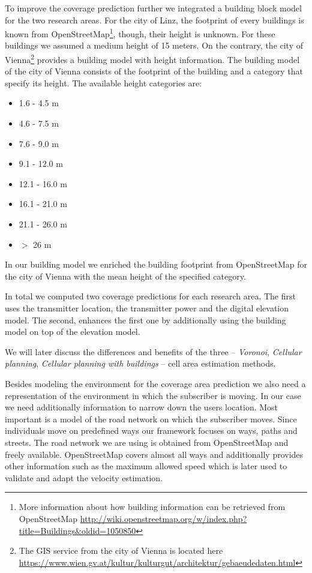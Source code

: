 \documentclass[twocolumn]{bmcart}%
\begin{document}
To improve the coverage prediction further we integrated a building block model for the two research areas. For the city of Linz, the footprint of every buildings is known from OpenStreetMap\footnote{More information about how building information can be retrieved from OpenStreetMap \url{http://wiki.openstreetmap.org/w/index.php?title=Buildings&oldid=1050850}}, though, their height is unknown. For these buildings we assumed a medium height of 15 meters. On the contrary, the city of Vienna\footnote{The GIS service from the city of Vienna is located here \url{https://www.wien.gv.at/kultur/kulturgut/architektur/gebaeudedaten.html}} provides a building model with height information. The building model of the city of Vienna consists of the footprint of the building and a category that specify its height. The available height categories are: 
\begin{itemize}
\item 1.6 - 4.5 m
\item 4.6 - 7.5 m
\item 7.6 - 9.0 m
\item 9.1 - 12.0 m
\item 12.1 - 16.0 m
\item 16.1 - 21.0 m
\item 21.1 - 26.0 m
\item $>$ 26 m
\end{itemize}

In our building model we enriched the building footprint from OpenStreetMap for the city of Vienna with the mean height of the specified category.

In total we computed two coverage predictions for each research area. The first uses the transmitter location, the transmitter power and the digital elevation model. The second, enhances the first one by additionally using the building model on top of the elevation model.

We will later discuss the differences and benefits of the three -- \emph{Voronoi}, \emph{Cellular planning}, \emph{Cellular planning with buildings} -- cell area estimation methods.\newline

Besides modeling the environment for the coverage area prediction we also need a representation of the environment in which the subscriber is moving. In our case we need additionally information to narrow down the users location. Most important is a model of the road network on which the subscriber moves. Since individuals move on predefined ways our framework focuses on ways, paths and streets. The road network we are using is obtained from OpenStreetMap and freely available. OpenStreetMap covers almost all ways and additionally provides other information such as the maximum allowed speed which is later used to validate and adapt the velocity estimation.\newline
\end{document}
